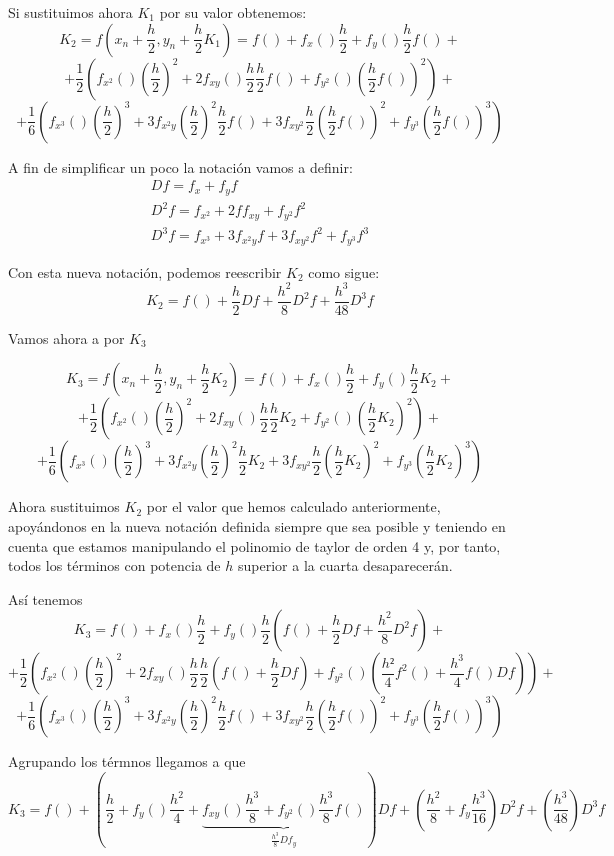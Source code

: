 \documentclass[nochap]{apuntes}
\begin{document}
Si sustituimos ahora $K_1$ por su valor obtenemos:
\[K_2 = f\left(x_n+\frac{h}{2},y_n+\frac{h}{2}K_1\right)=f()+f_x()\frac{h}{2}+f_y()\frac{h}{2}f() +\]
\[+ \frac{1}{2}\left( f_{x^2}()\left(\frac{h}{2}\right)^2 +2 f_{xy}()\frac{h}{2}\frac{h}{2}f() +f_{y^2}()\left(\frac{h}{2}f()\right)^2\right) +\]
\[+   \frac{1}{6}\left( f_{x^3}()\left(\frac{h}{2}\right)^3 + 3f_{x^2y}\left(\frac{h}{2}\right)^2\frac{h}{2}f() + 3f_{xy^2}\frac{h}{2}\left(\frac{h}{2}f()\right)^2 + f_{y^3}\left(\frac{h}{2}f()\right)^3\right)\]

A fin de simplificar un poco la notación vamos a definir:
\[\begin{array}{l}
Df = f_x+f_yf\\
D^2f = f_{x^2}+2ff_{xy}+f_{y^2}f^2\\
D^3f = f_{x^3} + 3f_{x^2y}f + 3f_{xy^2}f^2 + f_{y^3}f^3
\end{array}\]

Con esta nueva notación, podemos reescribir $K_2$ como sigue:
\[K_2 = f() + \frac{h}{2}Df + \frac{h^2}{8}D^2f + \frac{h^3}{48}D^3f\]

Vamos ahora a por $K_3$

\[K_3 = f\left(x_n+\frac{h}{2},y_n+\frac{h}{2}K_2\right)=f()+f_x()\frac{h}{2}+f_y()\frac{h}{2}K_2 +\]
\[+ \frac{1}{2}\left( f_{x^2}()\left(\frac{h}{2}\right)^2 +2 f_{xy}()\frac{h}{2}\frac{h}{2}K_2 +f_{y^2}()\left(\frac{h}{2}K_2\right)^2\right) +\]
\[+   \frac{1}{6}\left( f_{x^3}()\left(\frac{h}{2}\right)^3 + 3f_{x^2y}\left(\frac{h}{2}\right)^2\frac{h}{2}K_2 + 3f_{xy^2}\frac{h}{2}\left(\frac{h}{2}K_2\right)^2 + f_{y^3}\left(\frac{h}{2}K_2\right)^3\right)\]

Ahora sustituimos $K_2$ por el valor que hemos calculado anteriormente, apoyándonos en la nueva notación definida siempre que sea posible y teniendo en cuenta que estamos manipulando el polinomio de taylor de orden 4 y, por tanto, todos los términos con potencia de $h$ superior a la cuarta desaparecerán.

Así tenemos
\[K_3 =f()+f_x()\frac{h}{2}+f_y()\frac{h}{2}\left( f()+\frac{h}{2}Df + \frac{h^2}{8}D^2f\right) +\]
\[+ \frac{1}{2}\left( f_{x^2}()\left(\frac{h}{2}\right)^2 +2 f_{xy}()\frac{h}{2}\frac{h}{2}\left(f() + \frac{h}{2}Df \right) +f_{y^2}()\left(\frac{h²}{4}f^2()+\frac{h^3}{4}f()Df\right)\right) +\]
\[+\frac{1}{6}\left( f_{x^3}()\left(\frac{h}{2}\right)^3 + 3f_{x^2y}\left(\frac{h}{2}\right)^2\frac{h}{2}f()+ 3f_{xy^2}\frac{h}{2}\left(\frac{h}{2}f()\right)^2 + f_{y^3}\left(\frac{h}{2}f()\right)^3\right)\]

Agrupando los térmnos llegamos a que
\[K_3 = f()+\left(\frac{h}{2}+f_y()\frac{h^2}{4}+\underbrace{f_{xy}()\frac{h^3}{8}+f_{y^2}()\frac{h^3}{8}f()}_{\frac{h^3}{8}Df_y}\right)Df+\left(\frac{h^2}{8} + f_y\frac{h^3}{16}\right)D^2f +\left(\frac{h^3}{48}\right)D^3f\]
\end{document}
